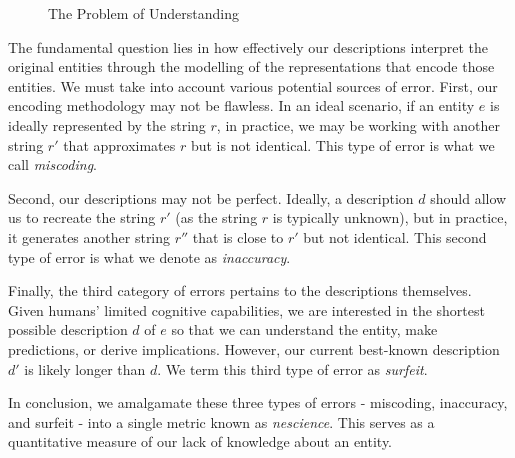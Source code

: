 \begin{figure}[t]
\centering
{}
\caption{\label{fig:representationProblem}The Problem of Understanding}
\end{figure}

The fundamental question lies in how effectively our descriptions interpret the original entities through the modelling of the representations that encode those entities. We must take into account various potential sources of error. First, our encoding methodology may not be flawless. In an ideal scenario, if an entity $e$ is ideally represented by the string $r$, in practice, we may be working with another string $r'$ that approximates $r$ but is not identical. This type of error is what we call \emph{miscoding}.

Second, our descriptions may not be perfect. Ideally, a description $d$ should allow us to recreate the string $r'$ (as the string $r$ is typically unknown), but in practice, it generates another string $r''$ that is close to $r'$ but not identical. This second type of error is what we denote as \emph{inaccuracy}.

Finally, the third category of errors pertains to the descriptions themselves. Given humans' limited cognitive capabilities, we are interested in the shortest possible description $d$ of $e$ so that we can understand the entity, make predictions, or derive implications. However, our current best-known description $d'$ is likely longer than $d$. We term this third type of error as \emph{surfeit}. 

In conclusion, we amalgamate these three types of errors - miscoding, inaccuracy, and surfeit - into a single metric known as \emph{nescience}. This serves as a quantitative measure of our lack of knowledge about an entity.

